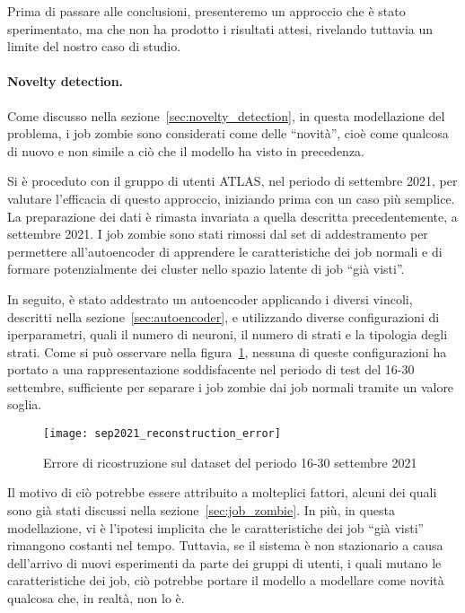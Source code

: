 Prima di passare alle conclusioni, presenteremo un approccio che è stato
sperimentato, ma che non ha prodotto i risultati attesi, rivelando tuttavia un
limite del nostro caso di studio.

\paragraph{Novelty detection.} Come discusso nella
sezione~\ref{sec:novelty_detection}, in questa modellazione del problema, i
job zombie sono considerati come delle ``novità'', cioè come qualcosa di nuovo
e non simile a ciò che il modello ha visto in precedenza. 

Si è proceduto con il gruppo di utenti ATLAS, nel periodo di settembre 2021,
per valutare l'efficacia di questo approccio, iniziando prima con un caso più
semplice. La preparazione dei dati è rimasta invariata a quella descritta
precedentemente, a settembre 2021. I job zombie sono stati rimossi dal set di
addestramento per permettere all'autoencoder di apprendere le caratteristiche
dei job normali e di formare potenzialmente dei cluster nello spazio latente
di job ``già visti''. 

In seguito, è stato addestrato un autoencoder applicando i diversi vincoli,
descritti nella sezione~\ref{sec:autoencoder}, e utilizzando diverse
configurazioni di iperparametri, quali il numero di neuroni, il numero di
strati e la tipologia degli strati. Come si può osservare nella
figura~\ref{fig:sep2021_reconstruction_error}, nessuna di queste
configurazioni ha portato a una rappresentazione soddisfacente nel periodo di
test del 16-30 settembre, sufficiente per separare i job zombie dai job
normali tramite un valore soglia.

\begin{figure}[!ht]
    \centering 
    \texttt{[image: sep2021\_reconstruction\_error]}
    \caption{Errore di ricostruzione sul dataset del periodo 16-30 settembre
    2021}
    \label{fig:sep2021_reconstruction_error}
\end{figure}

Il motivo di ciò potrebbe essere attribuito a molteplici fattori, alcuni dei
quali sono già stati discussi nella sezione~\ref{sec:job_zombie}. In più, in
questa modellazione, vi è l'ipotesi implicita che le caratteristiche dei job
``già visti'' rimangono costanti nel tempo. Tuttavia, se il sistema è non
stazionario a causa dell'arrivo di nuovi esperimenti da parte dei gruppi di
utenti, i quali mutano le caratteristiche dei job, ciò potrebbe portare il
modello a modellare come novità qualcosa che, in realtà, non lo è.
